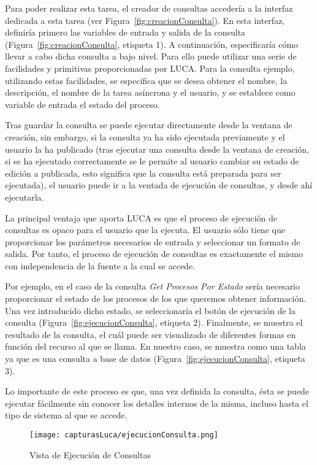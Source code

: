 Para poder realizar esta tarea, el creador de consultas accedería a la interfaz dedicada a esta tarea (ver Figura~\ref{fig:creacionConsulta}). En esta interfaz, definiría primero las variables de entrada y salida de la consulta (Figura~\ref{fig:creacionConsulta}, etiqueta 1). A continuación, especificaría cómo llevar a cabo dicha consulta a bajo nivel. Para ello puede utilizar una serie de facilidades y primitivas proporcionadas por LUCA. Para la consulta ejemplo, utilizando estas facilidades, se especifica que se desea obtener el nombre, la descripción, el nombre de la tarea asíncrona y el usuario, y se establece como variable de entrada el estado del proceso.

Tras guardar la consulta se puede ejecutar directamente desde la ventana de creación, sin embargo, si la consulta ya ha sido ejecutada previamente y el usuario la ha publicado (tras ejecutar una consulta desde la ventana de creación, si se ha ejecutado correctamente se le permite al usuario cambiar su estado de edición a publicada, esto significa que la consulta está preparada para ser ejecutada), el usuario puede ir a la ventada de ejecución de consultas, y desde ahí ejecutarla.

La principal ventaja que aporta LUCA es que el proceso de ejecución de consultas es opaco para el usuario que la ejecuta. El usuario sólo tiene que proporcionar los parámetros necesarios de entrada y seleccionar un formato de salida. Por tanto, el proceso de ejecución de consultas es exactamente el mismo con independencia de la fuente a la cual se accede.

Por ejemplo, en el caso de la consulta \emph{Get Procesos Por Estado} sería necesario proporcionar el estado de los procesos de los que queremos obtener información. Una vez introducido dicho estado, se seleccionaría el botón de ejecución de la consulta (Figura~\ref{fig:ejecucionConsulta}, etiqueta 2). Finalmente, se muestra el resultado de la consulta, el cuál puede ser visualizado de diferentes formas en función del recurso al que se llama. En nuestro caso, se muestra como una tabla ya que es una consulta a base de datos (Figura~\ref{fig:ejecucionConsulta}, etiqueta 3).

Lo importante de este proceso es que, una vez definida la consulta, ésta se puede ejecutar fácilmente sin conocer los detalles internos de la misma, incluso hasta el tipo de sistema al que se accede.

	\begin{figure}[!tb]
		\centering
		\texttt{[image: capturasLuca/ejecucionConsulta.png]}
		\caption{Vista de Ejecución de Consultas}\label{fig:ejecucionConsultas}
	\end{figure}

